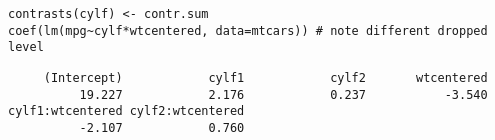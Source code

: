\documentclass[]{article}
\begin{document}
\begin{verbatim}
contrasts(cylf) <- contr.sum
coef(lm(mpg~cylf*wtcentered, data=mtcars)) # note different dropped level
\end{verbatim}

\begin{verbatim}
     (Intercept)            cylf1            cylf2       wtcentered 
          19.227            2.176            0.237           -3.540 
cylf1:wtcentered cylf2:wtcentered 
          -2.107            0.760 
\end{verbatim}
\end{document}
